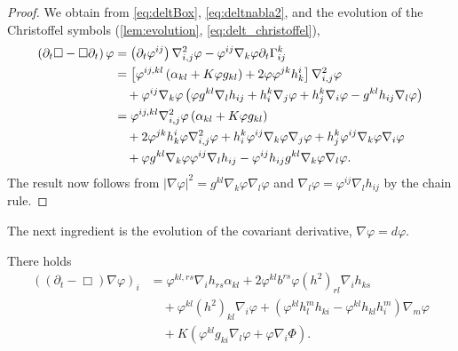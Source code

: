 \documentclass{amsart}
\begin{document}
\begin{proof}
We obtain from \cref{eq:deltBox}, \cref{eq:deltnabla2}, and the evolution of the Christoffel symbols (\cref{lem:evolution}, \cref{eq:delt_christoffel}),
\[
\begin{split}
\left(\partial_{t}\Box - \Box\partial_{t}\right) \varphi &= \left(\partial_{t}\varphi^{ij}\right) \nabla^2_{i,j} \varphi - \varphi^{ij}\nabla_k \varphi\partial_t \Gamma^{k}_{ij} \\
&= \left[\varphi^{ij,kl} \left(\alpha_{kl} + K \varphi g_{kl}\right) + 2\varphi\varphi^{jk}h^{i}_{k}\right] \nabla^2_{i,j} \varphi \\
&\quad + \varphi^{ij} \nabla_k \varphi \left(\varphi g^{kl} \nabla_l h_{ij} + h^k_i \nabla_j \varphi + h^k_j \nabla_i \varphi - g^{kl} h_{ij} \nabla_l \varphi\right) \\
&= \varphi^{ij,kl} \nabla^2_{i,j} \varphi \left(\alpha_{kl} + K \varphi g_{kl}\right) \\
&\quad + 2\varphi^{jk}h^{i}_{k}\varphi \nabla^2_{i,j} \varphi + h^k_i \varphi^{ij} \nabla_k \varphi \nabla_j \varphi + h^k_j \varphi^{ij} \nabla_k \varphi \nabla_i \varphi \\
&\quad + \varphi g^{kl}\nabla_k \varphi \varphi^{ij} \nabla_l h_{ij} - \varphi^{ij} h_{ij} g^{kl}\nabla_k \varphi \nabla_l \varphi.
\end{split}
\]
The result now follows from \(|\nabla \varphi|^2 = g^{kl}\nabla_k \varphi \nabla_l \varphi\) and \(\nabla_l \varphi = \varphi^{ij} \nabla_l h_{ij}\) by the chain rule.
\end{proof}

The next ingredient is the evolution of the covariant derivative, \(\nabla \varphi = d\varphi\).

\begin{lemma}
\label{lem:Evgradphi}
There holds
\[
\begin{split}
\left((\partial_{t}-\Box)\nabla\varphi\right)_{i} &= \varphi^{kl,rs}\nabla_i h_{rs} \alpha_{kl} + 2 \varphi^{kl} b^{rs} \varphi(h^2)_{rl} \nabla_i h_{ks} \\
&\quad + \varphi^{kl}(h^2)_{kl}\nabla_i \varphi + \left(\varphi^{kl}h^{m}_{l}h_{ki} - \varphi^{kl}h_{kl}h^{m}_{i}\right) \nabla_m \varphi\\
&\quad + K\left(\varphi^{kl}g_{ki} \nabla_l \varphi + \varphi \nabla_i \Phi\right).
\end{split}
\]
\end{lemma}
\end{document}
